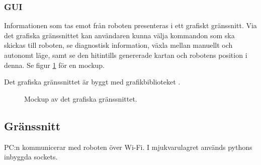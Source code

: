 \documentclass[a4paper,11pt]{article}
\begin{document}
\subsubsection{GUI}
Informationen som tas emot från roboten presenteras i ett grafiskt gränssnitt. Via det grafiska gränssnittet kan användaren kunna välja kommandon som ska skickas till roboten, se diagnostisk information, växla mellan manuellt och autonomt läge, samt se den hitintills genererade kartan och robotens position i denna. Se figur \ref{fig:gui_mockup} för en mockup.

Det grafiska gränssnittet är byggt med grafikbiblioteket \cite{tkinter}.

\begin{figure}[h!]
    \caption{Mockup av det grafiska gränssnittet.}
    \label{fig:gui_mockup}
\end{figure}

\subsection{Gränssnitt} \label{ssec:PCInterface}

PC:n kommunicerar med roboten över Wi-Fi. I mjukvarulagret används pythons inbyggda sockets.
\end{document}
